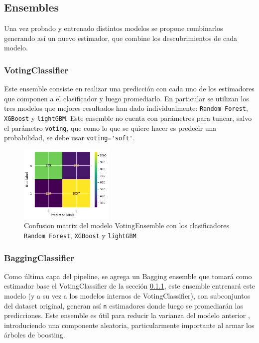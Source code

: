 \documentclass[titlepage,a4paper]{article}
\begin{document}
\subsection{Ensembles}\label{sub:ensembles}
Una vez probado y entrenado distintos modelos se propone combinarlos generando así un nuevo estimador, que combine los descubrimientos de cada modelo.

\subsubsection{VotingClassifier}\label{subsub:voting}
Este ensemble consiste en realizar una predicción con cada uno de los estimadores que componen a el clasificador y luego promediarlo. En particular se utilizan los tres modelos que mejores resultados han dado individualmente: \verb|Random Forest|, \verb|XGBoost| y \verb|lightGBM|. Este ensemble no cuenta con parámetros para tunear, salvo el parámetro \verb|voting|, que como lo que se quiere hacer es predecir una probabilidad, se debe usar \verb|voting='soft'|.

\begin{figure}[H]
\centering
\includegraphics[width=0.4\textwidth]{images/conf_mat_voting_ens.png}
\cprotect\caption{\label{fig:plot_tree} Confusion matrix del modelo VotingEnsemble con los clasificadores \verb|Random Forest|, \verb|XGBoost| y \verb|lightGBM|}
\end{figure}

\subsubsection{BaggingClassifier}\label{subsub:bagging}
Como última capa del pipeline, se agrega un Bagging ensemble que tomará como estimador base el VotingClassifier de la sección \ref{subsub:voting}, este ensemble entrenará este modelo (y a su vez a los modelos internos de VotingClassifier), con subconjuntos del dataset original, generan así \verb|n| estimadores donde luego se promediarán las predicciones. Este ensemble es útil para reducir la varianza del modelo anterior \cite{bagging_ensembre}, introduciendo una componente aleatoria, particularmente importante al armar los árboles de boosting.
\end{document}
